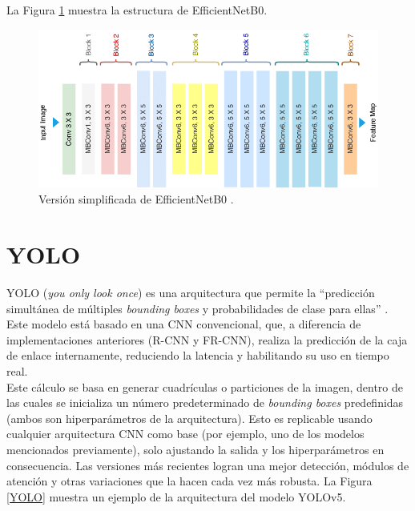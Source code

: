 La Figura \ref{EfficientNetB0} muestra la estructura de 
EfficientNetB0.

\begin{figure}[h!] 
    \includegraphics[width=1\textwidth]{images/EfficientNetB0.png} 
    \centering 
    \caption{Versión simplificada de EfficientNetB0 \protect\cite{EfficientNetB0}.} 
    \label{EfficientNetB0} 
\end{figure}

\section{YOLO} 
YOLO (\textit{you only look once}) es una arquitectura que 
permite la ``predicción simultánea de múltiples \textit{bounding boxes} 
y probabilidades de clase para ellas'' \cite{Redmon2015}. 
Este modelo está basado en una CNN convencional, que, a diferencia 
de implementaciones anteriores (R-CNN y FR-CNN), realiza la 
predicción de la caja de enlace internamente, reduciendo la latencia 
y habilitando su uso en tiempo real.\\

Este cálculo se basa en generar cuadrículas o particiones de la 
imagen, dentro de las cuales se inicializa un número predeterminado 
de \textit{bounding boxes} predefinidas (ambos son hiperparámetros de la 
arquitectura). Esto es replicable usando cualquier arquitectura 
CNN como base (por ejemplo, uno de los modelos mencionados previamente), 
solo ajustando la salida y los hiperparámetros en consecuencia. 
Las versiones más recientes logran una mejor detección, módulos de 
atención y otras variaciones que la hacen cada vez más robusta. 
La Figura \ref{YOLO} muestra un ejemplo de la arquitectura del modelo 
YOLOv5.

